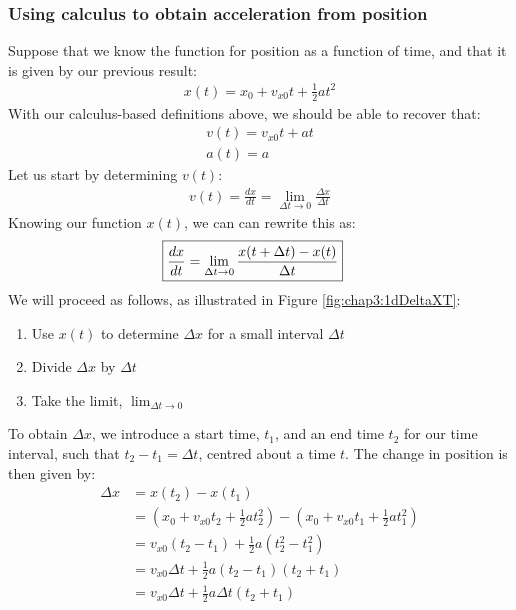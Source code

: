 \subsubsection{Using calculus to obtain acceleration from position}
Suppose that we know the function for position as a function of time, and that it is given by our previous result:
\begin{align*}
x(t)=x_0+v_{x0}t+\frac{1}{2}at^2
\end{align*}
With our calculus-based definitions above, we should be able to recover that:
\begin{align*}
v(t) = v_{x0}t+at\\
a(t) = a
\end{align*} 
Let us start by determining $v(t)$:
\begin{align*}
v(t) = \frac{dx}{dt}=\lim_{\Delta t\to 0} \frac{\Delta x}{\Delta t}
\end{align*}
Knowing our function $x(t)$, we can can rewrite this as:
\begin{align}
\Aboxed{ \frac{dx}{dt}=\lim_{\Delta t\to 0} \frac{x(t+\Delta t)-x(t)}{\Delta t} }
\end{align}
We will proceed as follows, as illustrated in Figure \ref{fig:chap3:1dDeltaXT}:
\begin{enumerate}
\item Use $x(t)$ to determine $\Delta x$ for a small interval $\Delta t$
\item Divide $\Delta x$ by $\Delta t$
\item Take the limit, $\lim_{\Delta t\to 0}$
\end{enumerate}
To obtain $\Delta x$, we introduce a start time, $t_1$, and an end time $t_2$ for our time interval, such that $t_2-t_1=\Delta t$, centred about a time $t$. The change in position is then given by:
\begin{align*}
\Delta x &= x(t_2) - x(t_1)\\
&=\left(x_0+v_{x0}t_2+\frac{1}{2}at_2^2\right )- \left(x_0+v_{x0}t_1+\frac{1}{2}at_1^2\right )\\
&=v_{x0}(t_2-t_1)+\frac{1}{2}a(t_2^2-t_1^2)\\
&=v_{x0}\Delta t+\frac{1}{2}a(t_2-t_1)(t_2+t_1)\\
&=v_{x0}\Delta t+\frac{1}{2}a\Delta t (t_2+t_1)\\
\end{align*}

